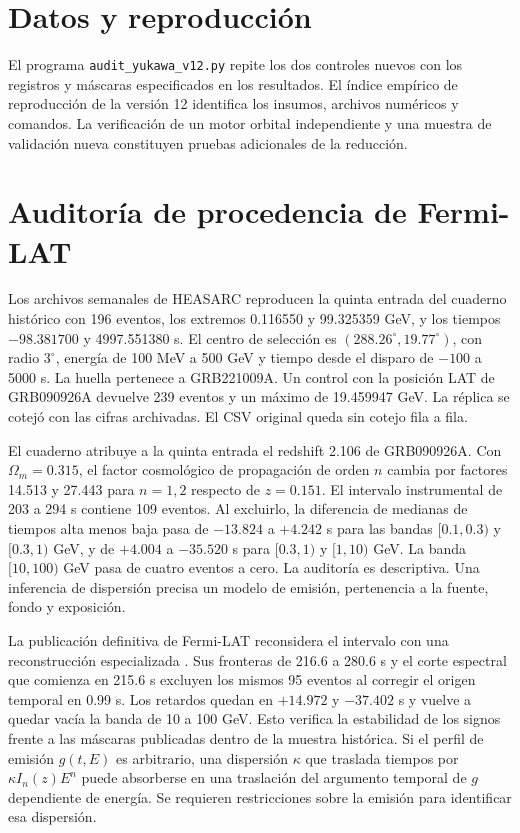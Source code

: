 \documentclass[11pt,a4paper]{article}
\begin{document}
\section{Datos y reproducción}
El programa \texttt{audit\_yukawa\_v12.py} repite los dos controles nuevos con los registros y máscaras especificados en los resultados. El índice empírico de reproducción de la versión 12 identifica los insumos, archivos numéricos y comandos. La verificación de un motor orbital independiente y una muestra de validación nueva constituyen pruebas adicionales de la reducción.

\appendix
\section{Auditoría de procedencia de Fermi-LAT}
Los archivos semanales de HEASARC reproducen la quinta entrada del cuaderno histórico con 196 eventos, los extremos 0.116550 y 99.325359 GeV, y los tiempos $-98.381700$ y 4997.551380 s. El centro de selección es $(288.26^\circ,19.77^\circ)$, con radio $3^\circ$, energía de 100 MeV a 500 GeV y tiempo desde el disparo de $-100$ a 5000 s. La huella pertenece a GRB221009A. Un control con la posición LAT de GRB090926A devuelve 239 eventos y un máximo de 19.459947 GeV. La réplica se cotejó con las cifras archivadas. El CSV original queda sin cotejo fila a fila.

El cuaderno atribuye a la quinta entrada el redshift 2.106 de GRB090926A. Con $\Omega_m=0.315$, el factor cosmológico de propagación de orden $n$ \cite{vasileiou} cambia por factores 14.513 y 27.443 para $n=1,2$ respecto de $z=0.151$. El intervalo instrumental de 203 a 294 s \cite{gcn} contiene 109 eventos. Al excluirlo, la diferencia de medianas de tiempos alta menos baja pasa de $-13.824$ a $+4.242$ s para las bandas $[0.1,0.3)$ y $[0.3,1)$ GeV, y de $+4.004$ a $-35.520$ s para $[0.3,1)$ y $[1,10)$ GeV. La banda $[10,100)$ GeV pasa de cuatro eventos a cero. La auditoría es descriptiva. Una inferencia de dispersión precisa un modelo de emisión, pertenencia a la fuente, fondo y exposición.

La publicación definitiva de Fermi-LAT reconsidera el intervalo con una reconstrucción especializada \cite{axelsson}. Sus fronteras de 216.6 a 280.6 s y el corte espectral que comienza en 215.6 s excluyen los mismos 95 eventos al corregir el origen temporal en 0.99 s. Los retardos quedan en $+14.972$ y $-37.402$ s y vuelve a quedar vacía la banda de 10 a 100 GeV. Esto verifica la estabilidad de los signos frente a las máscaras publicadas dentro de la muestra histórica. Si el perfil de emisión $g(t,E)$ es arbitrario, una dispersión $\kappa$ que traslada tiempos por $\kappa I_n(z)E^n$ puede absorberse en una traslación del argumento temporal de $g$ dependiente de energía. Se requieren restricciones sobre la emisión para identificar esa dispersión.
\end{document}
